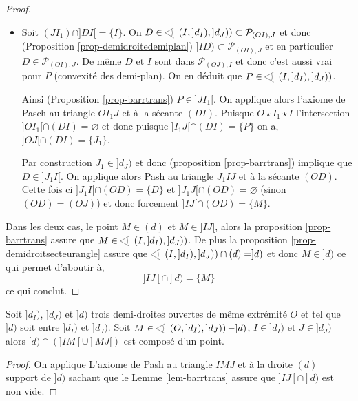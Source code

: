 \begin{lem}
\begin{proof}
\begin{itemize}[$\bullet$]
            \item Soit $(JI_1)\cap ]DI[=\{I\}$. On $D\in \anglesaillant\left(I,]d_I),]d_J)\right)\subset \mathcal{P}_{(OI),J}$ et donc (Proposition \ref{prop-demidroitedemiplan}) $]ID)\subset \mathcal{P}_{(OI),J}$ et en particulier $D \in \mathcal{P}_{(OI),J}$. De même $D$ et $I$ sont dans $\mathcal{P}_{(OJ),I}$ et donc c'est aussi vrai pour $P$ (convexité des demi-plan). On en déduit que $P\in \anglesaillant\left(I,]d_I),]d_J)\right)$. 
            
            Ainsi (Proposition \ref{prop-barrtrans}) $P\in]J I_1[$. On applique alors l'axiome de Pasch au triangle $OI_1 J$ et à la sécante $(DI)$. Puisque $O\star I_1\star I$ l'intersection $]OI_1[\cap (DI)=\varnothing$ et donc puisque $]I_1 J[\cap (DI)=\{P\}$ on a, $]OJ[\cap (DI)=\{J_1\}$.

            Par construction $J_1\in ]d_J)$ et donc (proposition \ref{prop-barrtrans}) implique que $D\in ]J_1 I[$. On applique alors Pash au triangle $J_1 I J$ et à la sécante $(OD)$. Cette fois ci $]J_1 I[\cap (OD)=\{D\}$ et $]J_1 J[\cap (OD)=\varnothing$ (sinon $(OD)=(OJ)$) et donc forcement $]IJ[\cap (OD)=\{M\}$. 
        \end{itemize}
        Dans les deux cas, le point $M\in (d)$ et  $M\in ]IJ[$, alors la proposition \ref{prop-barrtrans} assure que $M\in \anglesaillant\left(I,]d_I),]d_J)\right)$. De plus la proposition \ref{prop-demidroitsecteurangle} assure que $\anglesaillant\left(I,]d_I),]d_J)\right) \cap (d) = ]d)$ et donc $M\in ]d)$ ce qui permet d'aboutir à,
        \begin{equation*}
            ]IJ[\cap ]d) =\{M\}
        \end{equation*}
        ce qui conclut.
    \end{proof}    
\end{lem}
\begin{lem}\label{lem-pashsect}
    Soit $]d_I)$, $]d_J)$ et $]d)$ trois demi-droites ouvertes de même extrémité $O$ et tel que $]d)$ soit entre $]d_I)$ et $]d_J)$. Soit $M \in \anglesaillant\left({O},{]d_I)},{]d_J)}\right) - ]d)$, $I\in ]d_I)$ et $J\in]d_J)$ alors $[d)\cap\left(]IM[\cup]MJ[\right)$ est composé d'un point. 
    \begin{proof}
        On applique L'axiome de Pash au triangle $IMJ$ et à la droite $(d)$ support de $]d)$ sachant que le Lemme \ref{lem-barrtrans} assure que $]IJ[\cap ]d)$ est non vide. 
    \end{proof}
\end{lem}
